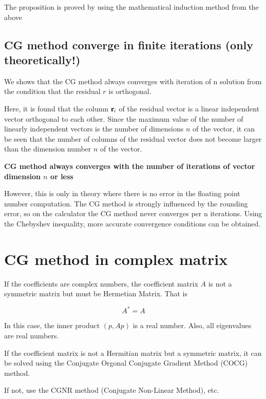 The proposition is proved by using the mathematical induction method from the above


\subsection{CG method converge in finite iterations (only theoretically!)}

We shows that the CG method always converges with iteration of n solution from the condition that the residual $r$ is orthogonal.

Here, it is found that the column $\mathbf{r}_i$ of the residual vector is a linear independent vector orthogonal to each other. Since the maximum value of the number of linearly independent vectors is the number of dimensions $n$ of the vector, it can be seen that the number of columns of the residual vector does not become larger than the dimension number $n$ of the vector.
%
\begin{screen}
\textbf{CG method always converges with the number of iterations of vector dimension $n$ or less}
\end{screen}

However, this is only in theory where there is no error in the floating point number computation.
%
The CG method is strongly influenced by the rounding error, so on the calculator the CG method never converges per n iterations. 
%
Using the Chebyshev inequality, more accurate convergence conditions can be obtained.


\section{CG method in complex matrix}

If the coefficients are complex numbers, the coefficient matrix $A$ is not a symmetric matrix but must be Hermetian Matrix. That is


\begin{equation}
A^*=A
\end{equation}



In this case, the inner product $(p,Ap)$ is a real number.
Also, all eigenvalues ​​are real numbers.

If the coefficient matrix is ​​not a Hermitian matrix but a symmetric matrix, it can be solved using the Conjugate Orgonal Conjugate Gradient Method (COCG) method.

If not, use the CGNR method (Conjugate Non-Linear Method), etc.


